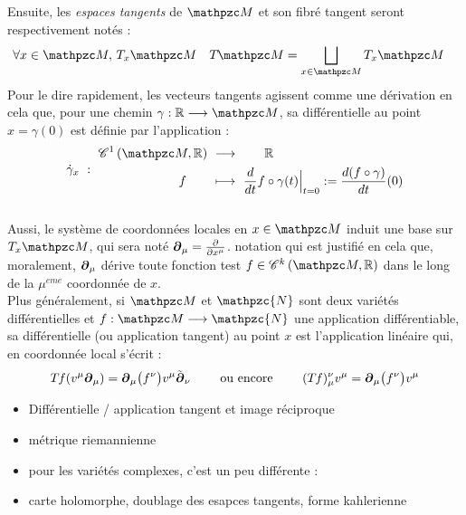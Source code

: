 Ensuite, les \emph{espaces tangents} de $\manu$  et son fibré tangent seront respectivement notés :
\begin{align}
	\forall x\in\manu,\ &\tg[x]{\manu}  &  \tg{\manu} &= \bigsqcup_{x\in\manu}\tg[x]{\manu}
\end{align} 
Pour le dire rapidement, les vecteurs tangents agissent comme une dérivation en cela que, pour une chemin $\gamma : \R\lr\manu$, sa différentielle au point $x=\gamma(0)$ est définie par l'application :
\begin{equation} \label{eq:def2vec_tg}
	\dot{\gamma}_{x}\  :\ \begin{aligned}
		\conti[1]{\manu}{\R}\ &\lr\qquad \R \\ 
		f\qquad &\lmt\ \frac{d}{dt} f \circ\gamma(t)\Big|_{t=0} \defeq \frac{d(f \circ \gamma)}{dt}(0)
	\end{aligned}
\end{equation}
\\
Aussi, le système de coordonnées locales en $x\in\manu$ induit une base sur $\tg[x]{\manu}$, qui sera noté  $\boldsymbol{\partial}_\mu = \frac{\partial}{\partial x^\mu}$. notation qui est justifié en cela que, moralement, $\boldsymbol{\partial}_\mu$ dérive toute fonction test $f\in\conti[k]{\manu}{\R}$ dans le long de la $\mu^{eme}$ coordonnée de $x$.
\\

Plus généralement, si $\manu$ et $\mathpzc{N}$ sont deux variétés différentielles et $f : \manu\lr \mathpzc{N}$ une application différentiable, sa différentielle (ou application tangent) au point $x$ est l'application linéaire qui, en coordonnée local s'écrit :
\[T_{}f(v^\mu \boldsymbol{\partial}_\mu) = \boldsymbol{\partial}_\mu\big( f^\nu \big)v^\mu \Tilde{\boldsymbol{\partial}}_\nu\qquad \text{ ou encore }\qquad  (T_{}f)_\mu^\nu v^\mu = \boldsymbol{\partial}_\mu\big( f^\nu \big)v^\mu\]

\begin{itemize}
	
	\item Différentielle / application tangent et image réciproque
	
	
	\item métrique riemannienne

	
	\item pour les variétés complexes, c'est un peu différente :
	
	\item carte holomorphe, doublage des esapces tangents, forme kahlerienne
	
\end{itemize}



